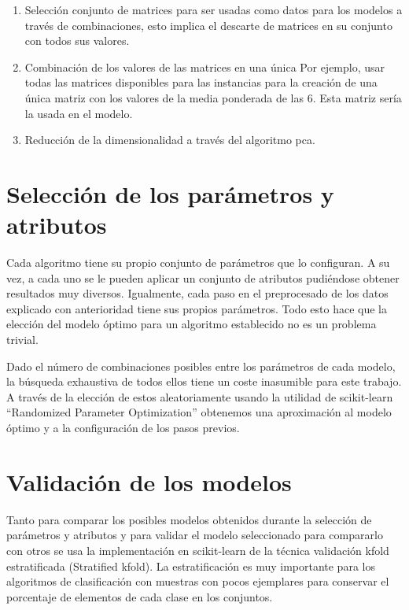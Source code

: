 \begin{enumerate}
    \item Selección conjunto de matrices para ser usadas como datos para los modelos a través de combinaciones, esto implica el descarte de matrices en su conjunto con todos sus valores.
    
    \item Combinación de los valores de las matrices en una única Por ejemplo, usar todas las matrices disponibles para las instancias para la creación de una única matriz con los valores de la media ponderada de las 6. Esta matriz sería la usada en el modelo.
    
    \item Reducción de la dimensionalidad a través del algoritmo \gls{pca}.
    
\end{enumerate}

\section{Selección de los parámetros y atributos}

Cada algoritmo tiene su propio conjunto de parámetros que lo configuran. A su vez, a cada uno se le pueden aplicar un conjunto de atributos pudiéndose obtener resultados muy diversos. Igualmente, cada paso en el preprocesado de los datos explicado con anterioridad tiene sus propios parámetros. Todo esto hace que la elección del modelo óptimo para un algoritmo establecido no es un problema trivial.

Dado el número de combinaciones posibles entre los parámetros de cada modelo, la búsqueda exhaustiva de todos ellos tiene un coste inasumible para este trabajo. A través de la elección de estos aleatoriamente usando la utilidad de scikit-learn ``Randomized Parameter Optimization'' obtenemos una aproximación al modelo óptimo y a la configuración de los pasos previos.

\section{Validación de los modelos}
Tanto para comparar los posibles modelos obtenidos durante la selección de parámetros y atributos y para validar el modelo seleccionado para compararlo con otros se usa la implementación en scikit-learn de la técnica validación \gls{kfold} estratificada (Stratified \gls{kfold}). La estratificación es muy importante para los algoritmos de clasificación con muestras con pocos ejemplares para conservar el porcentaje de elementos de cada clase en los conjuntos.

